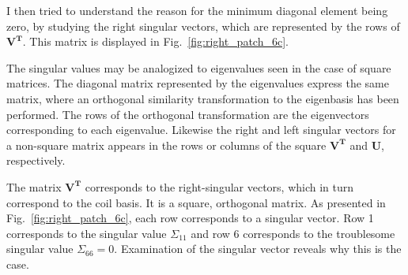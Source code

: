

I then tried to understand the reason for the minimum diagonal element
being zero, by studying the right singular vectors, which are
represented by the rows of $\bm{V^T}$.  This matrix is displayed in
Fig.~\ref{fig:right_patch_6c}.

The singular values may be analogized to eigenvalues seen in the case
of square matrices. The diagonal matrix represented by the
eigenvalues express the same matrix, where an orthogonal similarity
transformation to the eigenbasis has been performed.  The rows of the
orthogonal transformation are the eigenvectors corresponding to each
eigenvalue.  Likewise the right and left singular vectors for a
non-square matrix appears in the rows or columns of the square
$\bm{V^T}$ and $\bm{U}$, respectively.

The matrix $\bm{V^T}$ corresponds to the right-singular vectors, which
in turn correspond to the coil basis.  It is a square, orthogonal
matrix.  As presented in Fig.~\ref{fig:right_patch_6c}, each row
corresponds to a singular vector.  Row 1 corresponds to the singular
value $\Sigma_{11}$ and row 6 corresponds to the troublesome singular
value $\Sigma_{66}=0$.  Examination of the singular vector reveals why
this is the case.

